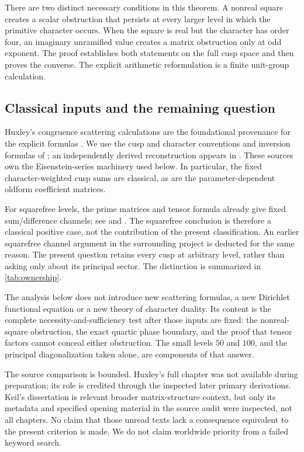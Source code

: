 There are two distinct necessary conditions in this theorem. A nonreal
square creates a scalar obstruction that persists at every larger level
in which the primitive character occurs. When the square is real but the
character has order four, an imaginary unramified value creates a matrix
obstruction only at odd exponent. The proof establishes both statements
on the full cusp space and then proves the converse. The explicit
arithmetic reformulation is a finite unit-group calculation.

\subsection{Classical inputs and the remaining question}

Huxley's congruence scattering calculations are the foundational
provenance for the explicit formulas \citep{Huxley1984}. We use the
cusp and character conventions and inversion formulas of
\citet[Sections 3, 6 and 7]{Young2019}; an independently derived
reconstruction appears in
\citet[Section 2.7, Lemma 2.19 and Remark 2.20]{BookerLeeStrombergsson2020}.
These sources own the Eisenstein-series machinery used below. In
particular, the fixed character-weighted cusp sums are classical, as
are the parameter-dependent oldform coefficient matrices.

For squarefree levels, the prime matrices and tensor formula already
give fixed sum/difference channels; see
\citet[Theorem 2.8]{CakoniChanillo2019} and
\citet[equation (19)]{LevitinStrohmaier2021}.
The squarefree conclusion is therefore a classical positive case,
not the contribution of the present classification. An earlier
squarefree channel argument in the surrounding project is deducted
for the same reason. The present question retains every cusp at
arbitrary level, rather than asking only about its principal sector.
The distinction is summarized in \cref{tab:ownership}.
\OwnershipTable

The analysis below does not introduce new scattering formulas, a new
Dirichlet functional equation or a new theory of character duality.
Its content is the complete necessity-and-sufficiency test after those
inputs are fixed: the nonreal-square obstruction, the exact quartic
phase boundary, and the proof that tensor factors cannot conceal either
obstruction. The small levels \(50\) and \(100\), and the principal
diagonalization taken alone, are components of that answer.

The source comparison is bounded. Huxley's full chapter was not available
during preparation; its role is credited through the inspected later
primary derivations. Keil's dissertation \citep{Keil2007} is relevant
broader matrix-structure context, but only its metadata and specified
opening material in the source audit were inspected, not all chapters.
No claim that those unread texts lack a consequence equivalent to the
present criterion is made. We do not claim worldwide priority from a
failed keyword search.

